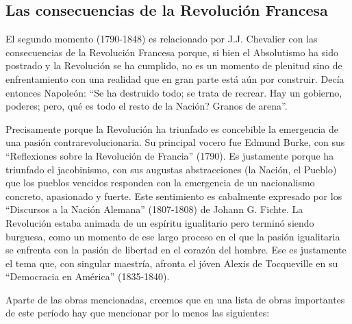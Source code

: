 \documentclass[
]{book}
\begin{document}
\hypertarget{las-consecuencias-de-la-revoluciuxf3n-francesa}{%
\subsection*{Las consecuencias de la Revolución Francesa}\label{las-consecuencias-de-la-revoluciuxf3n-francesa}}

El segundo momento (1790-1848) es relacionado por J.J. Chevalier con las consecuencias de la Revolución Francesa porque, si bien el Absolutismo ha sido postrado y la Revolución se ha cumplido, no es un momento de plenitud sino de enfrentamiento con una realidad que en gran parte está aún por construir. Decía entonces Napoleón: ``Se ha destruido todo; se trata de recrear. Hay un gobierno, poderes; pero, qué es todo el resto de la Nación? Granos de arena''.

Precisamente porque la Revolución ha triunfado es concebible la emergencia de una pasión contrarevolucionaria. Su principal vocero fue Edmund Burke, con sus ``Reflexiones sobre la Revolución de Francia'' (1790). Es justamente porque ha triunfado el jacobinismo, con sus augustas abstracciones (la Nación, el Pueblo) que los pueblos vencidos responden con la emergencia de un nacionalismo concreto, apasionado y fuerte. Este sentimiento es cabalmente expresado por los ``Discursos a la Nación Alemana'' (1807-1808) de Johann G. Fichte. La Revolución estaba animada de un espíritu igualitario pero terminó siendo burguesa, como un momento de ese largo proceso en el que la pasión igualitaria se enfrenta con la pasión de libertad en el corazón del hombre. Ese es justamente el tema que, con singular maestría, afronta el jóven Alexis de Tocqueville en su ``Democracia en América'' (1835-1840).

Aparte de las obras mencionadas, creemos que en una lista de obras importantes de este período hay que mencionar por lo menos las siguientes:
\end{document}
